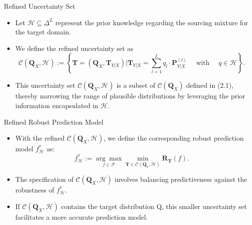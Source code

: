\documentclass{beamer}
\begin{document}
\begin{frame}{Refined Uncertainty Set}
    \begin{itemize}
        \item Let $\mathcal{H} \subseteq \Delta^{L}$ represent the prior knowledge regarding the sourcing mixture for the target domain.
        \item We define the refined uncertainty set as
        \[
        \mathcal{C}(\mathbf{Q}_{X}, \mathcal{H}) := \left\{\mathbf{T} = (\mathbf{Q}_{X}, \mathbf{T}_{Y | X})   |   \mathbf{T}_{Y | X} = \sum_{l = 1}^{L} q_{l} \cdot \mathbf{P}_{Y | X}^{(l)} \quad \text{ with } \quad q \in \mathcal{H} \right\}. 
        \]
        \item This uncertainty set $\mathcal{C}(\mathbf{Q}_{X}, \mathcal{H})$ is a subset of $\mathcal{C}(\mathbf{Q}_{X})$ defined in (2.1), thereby narrowing the range of plausible distributions by leveraging the prior information encapsulated in $\mathcal{H}$.
    \end{itemize}
\end{frame}

\begin{frame}{Refined Robust Prediction Model}
    \begin{itemize}
        \item With the refined $\mathcal{C}(\mathbf{Q}_{X}, \mathcal{H})$, we define the corresponding robust prediction model $f_{\mathcal{H}}^{*}$ as:
        \[
        f_{\mathcal{H}}^{*} := \underset{f \in \mathcal{F}}{\arg \max} \underset{\mathbf{T} \in \mathcal{C}(\mathbf{Q}_{x}, \mathcal{H})}{\min} \mathbf{R}_{\mathbf{T}}(f). 
        \]
        \item The specification of $\mathcal{C}(\mathbf{Q}_{X}, \mathcal{H})$ involves balancing predictiveness against the robustness of $f_{\mathcal{H}}^{*}$.
        \item If $\mathcal{C}(\mathbf{Q}_{X}, \mathcal{H})$ contains the target distribution Q, this smaller uncertainty set facilitates a more accurate prediction model.
    \end{itemize}
\end{frame}
\end{document}

